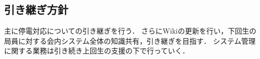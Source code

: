 \subsection*{引き継ぎ方針}

主に停電対応についての引き継ぎを行う．
さらにWikiの更新を行い，下回生の局員に対する会内システム全体の知識共有，引き継ぎを目指す．
システム管理に関する業務は引き続き上回生の支援の下で行っていく．

